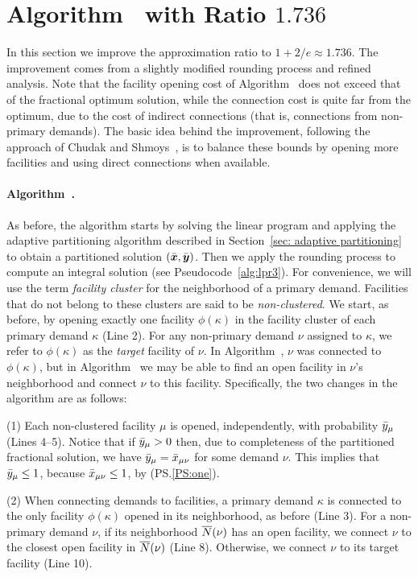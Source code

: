 \section{Algorithm~{\ECHS} with Ratio $1.736$}\label{sec: 1.736-approximation}

In this section we improve the approximation ratio to $1+2/e
\approx 1.736$. The improvement comes from a slightly modified
rounding process and refined analysis.  Note that the
facility opening cost of Algorithm~{\EGUP} does not exceed
that of the fractional optimum solution, while the
connection cost is quite far from the optimum, due to the
cost of indirect connections (that is, connections from
non-primary demands).  The basic idea behind the
improvement, following the approach of Chudak and
Shmoys~\cite{ChudakS04}, is to balance these bounds by
opening more facilities and using direct connections when available.


\paragraph{Algorithm~{\ECHS}.}
As before,
the algorithm starts by solving the linear program and applying the
adaptive partitioning algorithm  described in 
Section~\ref{sec: adaptive partitioning} to obtain a partitioned
solution $(\bar{\boldsymbol{x}}, \bar{\boldsymbol{y}})$. Then we apply the rounding
process to compute an integral solution (see Pseudocode~\ref{alg:lpr3}).  
For convenience, we will use
the term \emph{facility cluster} for the neighborhood of a
primary demand. Facilities that do not belong to these
clusters are said to be \emph{non-clustered}.  We start, as before, by
opening exactly one facility $\phi(\kappa)$ in the facility
cluster of each primary demand $\kappa$ (Line 2).  For any
non-primary demand $\nu$ assigned to $\kappa$, we refer to
$\phi(\kappa)$ as the \emph{target} facility of $\nu$.  In
Algorithm~{\EGUP}, $\nu$ was connected to $\phi(\kappa)$,
but in Algorithm~{\ECHS} we may be able to find an open
facility in $\nu$'s neighborhood and connect $\nu$ to this
facility.  Specifically, the two changes in the
algorithm are as follows:
%
\begin{description}
	\item{(1)} Each non-clustered facility $\mu$ is opened,
independently, with probability ${\bar y}_{\mu}$ (Lines
4--5). Notice that if ${\bar y}_\mu>0$ then,
due to completeness of the partitioned
fractional solution, we have ${\bar y}_{\mu}= {\bar x}_{\mu\nu}$
for some demand $\nu$. This implies that ${\bar y}_{\mu}\leq 1$,
because ${\bar x}_{\mu\nu}\le 1$, by (PS.\ref{PS:one}).
%
	\item{(2)} When connecting demands to facilities, a primary demand
$\kappa$ is connected to the only facility $\phi(\kappa)$
opened in its neighborhood, as before (Line 3).  For a
non-primary demand $\nu$, if its neighborhood ${\overline{N}}(\nu)$ has an open
facility, we connect $\nu$ to the closest open facility in ${\overline{N}}(\nu)$
(Line 8). Otherwise, we connect $\nu$ to
its target facility (Line 10).
%
\end{description}

